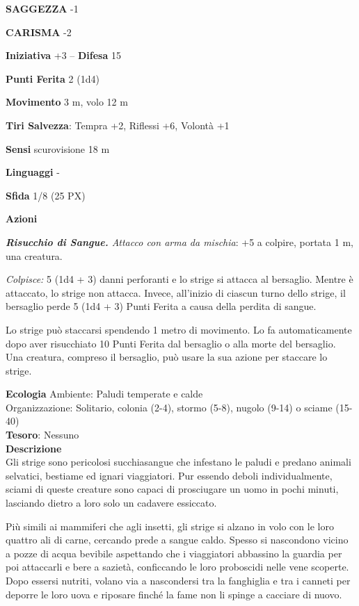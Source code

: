 \begin{multicols}{2}
\textbf{SAGGEZZA} -1

\textbf{CARISMA} -2

\textbf{Iniziativa} +3 -- \textbf{Difesa} 15

\textbf{Punti Ferita} 2 (1d4)

\textbf{Movimento} 3 m, volo 12 m

\textbf{Tiri Salvezza}: Tempra +2, Riflessi +6, Volontà +1

\textbf{Sensi} scurovisione 18 m

\textbf{Linguaggi} -

\textbf{Sfida} 1/8 (25 PX)

\textbf{Azioni}

\textit{\textbf{Risucchio di Sangue.} Attacco con arma da mischia}: +5 a colpire, portata 1 m, una creatura.

\textit{Colpisce:} 5 (1d4 + 3) danni perforanti e lo strige si attacca al bersaglio. Mentre è attaccato, lo strige non attacca. Invece, all'inizio di ciascun turno dello strige, il bersaglio perde 5 (1d4 + 3) Punti Ferita a causa della perdita di sangue.

Lo strige può staccarsi spendendo 1 metro di movimento. Lo fa automaticamente dopo aver risucchiato 10 Punti Ferita dal bersaglio o alla morte del bersaglio. Una creatura, compreso il bersaglio, può usare la sua azione per staccare lo strige.

\textbf{Ecologia}
Ambiente: Paludi temperate e calde\\
Organizzazione: Solitario, colonia (2-4), stormo (5-8), nugolo (9-14) o sciame (15-40)\\
\textbf{Tesoro}: Nessuno\\
\textbf{Descrizione}\\
Gli strige sono pericolosi succhiasangue che infestano le paludi e predano animali selvatici, bestiame ed ignari viaggiatori. Pur essendo deboli individualmente, sciami di queste creature sono capaci di prosciugare un uomo in pochi minuti, lasciando dietro a loro solo un cadavere essiccato.

Più simili ai mammiferi che agli insetti, gli strige si alzano in volo con le loro quattro ali di carne, cercando prede a sangue caldo. Spesso si nascondono vicino a pozze di acqua bevibile aspettando che i viaggiatori abbassino la guardia per poi attaccarli e bere a sazietà, conficcando le loro proboscidi nelle vene scoperte. Dopo essersi nutriti, volano via a nascondersi tra la fanghiglia e tra i canneti per deporre le loro uova e riposare finché la fame non li spinge a cacciare di nuovo.


\end{multicols}
